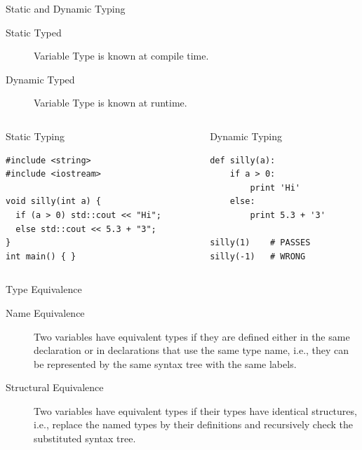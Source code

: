 \documentclass[presentation]{beamer}
\begin{document}
\begin{frame}[fragile,label={sec:orgheadline61}]{Static and Dynamic Typing}
 \begin{description}
\item[{Static Typed}] Variable Type is known at compile time.
\item[{Dynamic Typed}] Variable Type is known at runtime.
\end{description}

\begin{columns}
\begin{column}{0.5\columnwidth}
\begin{block}{Static Typing}
\begin{verbatim}
#include <string>
#include <iostream>

void silly(int a) {
  if (a > 0) std::cout << "Hi";
  else std::cout << 5.3 + "3";
}
int main() { }
\end{verbatim}
\end{block}
\end{column}

\begin{column}{0.5\columnwidth}
\begin{block}{Dynamic Typing}
\begin{verbatim}
def silly(a):
    if a > 0:
        print 'Hi'
    else:
        print 5.3 + '3'

silly(1)    # PASSES
silly(-1)   # WRONG
\end{verbatim}
\end{block}
\end{column}
\end{columns}
\end{frame}

\begin{frame}[label={sec:orgheadline62}]{Type Equivalence}
\begin{description}
\item[{Name Equivalence}] Two variables have equivalent types if they
are defined either in the same declaration or in declarations
that use the same type name, i.e., they can be represented by
the same syntax tree with the same labels.
\item[{Structural Equivalence}] Two variables have equivalent types if
their types have identical structures, i.e., replace the named
types by their definitions and recursively check the
substituted syntax tree.
\end{description}
\end{frame}
\end{document}
